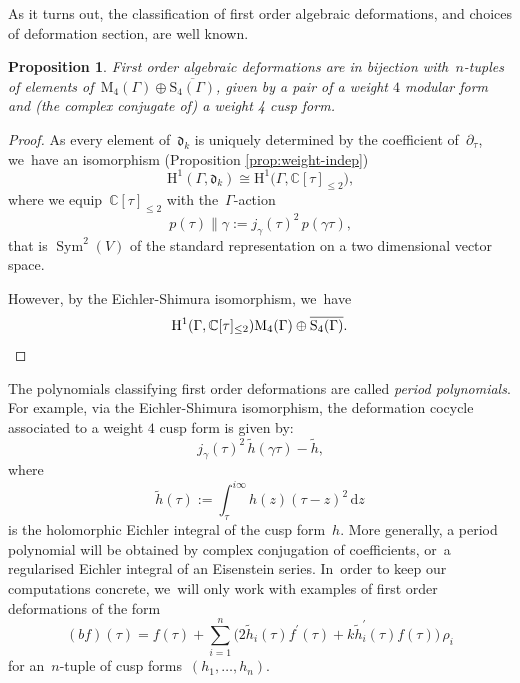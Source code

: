 \documentclass[10pt,a4paper]{article}
\numberwithin{equation}{section}
\theoremstyle{plain}
\newtheorem{proposition}[theoremcounter]{Proposition}
\theoremstyle{definition}
\newcommand{\tx}{\text}
\newcommand{\nbd}{\nobreakdash-\hspace{0pt}}
\newcommand{\bbC}{\ensuremath{\mathbb{C}}}
\newcommand{\frakd}{\ensuremath{\mathfrak{d}}}
\newcommand{\rmd}{\ensuremath{\mathrm{d}}}
\newcommand{\rmH}{\ensuremath{\mathrm{H}}}
\newcommand{\rmM}{\ensuremath{\mathrm{M}}}
\newcommand{\rmS}{\ensuremath{\mathrm{S}}}
\newcommand{\defeq}{:=}
\let\Ga\Gamma
\let\ga\gamma
\DeclareMathOperator{\Sym}{Sym}
\newcommand{\dz}{\rmd z}
\begin{document}
As it turns out, the classification of first order algebraic deformations, and choices of deformation section, are well known.

\begin{proposition}
\label{prop:first-order-cusp-forms}
First order algebraic deformations are in bijection with~$n$-tuples of elements of~$\rmM_4(\Ga)\oplus \overline{\rmS_4(\Ga)}$, given by a pair of a weight $4$ modular form and (the complex conjugate of) a weight 4 cusp form.
\end{proposition}
\begin{proof}
As every element of~$\frakd_k$ is uniquely determined by the coefficient of~$\partial_\tau$, we~have an isomorphism (Proposition \ref{prop:weight-indep})
\begin{equation*}
\rmH^1(\Ga,\frakd_k)
\cong
\rmH^1\bigl(\Ga, \bbC[\tau]_{\leq 2} \bigr)
\tx{,}
\end{equation*}
where we equip~$\bbC[\tau]_{\leq 2}$ with the~$\Ga$\nbd{}action
\begin{equation*}
p(\tau) \big\| \ga
\defeq
j_\ga(\tau)^2\, p(\ga\tau)
\tx{,}
\end{equation*}
that is $\Sym^2(V)$ of the standard representation on a two dimensional vector space.

However, by the Eichler-Shimura isomorphism, we~have
\[
\rmH^1(\Ga,\bbC[\tau]_{\leq 2})\rmM_4(\Ga)\oplus \overline{\rmS_4(\Ga)}.\qedhere
\]
\end{proof}

The polynomials classifying first order deformations are called \emph{period polynomials}. For example, via the Eichler-Shimura isomorphism, the deformation cocycle associated to a weight $4$ cusp form is given by:
\begin{equation*}
j_\ga(\tau)^2\,
\tilde{h}(\ga\tau) - \tilde{h}
\tx{,}
\end{equation*}
where
\begin{equation}\label{eq:eicher-integral-def}
\tilde{h}(\tau)
\defeq
\int_{\tau}^{i\infty} h(z)(\tau-z)^2 \,\dz
\end{equation}
is the holomorphic Eichler integral of the cusp form~$h$. More generally, a period polynomial will be obtained by complex conjugation of coefficients, or~a regularised Eichler integral of an Eisenstein series. In~order to keep our computations concrete, we~will only work with examples of first order deformations of the form
\begin{equation*}
(b f)(\tau)
=
f(\tau)
+
\sum_{i=1}^n
\bigl(2\tilde{h}_i(\tau) f^\prime(\tau) + k \tilde{h}^\prime_i(\tau) f(\tau) \bigr)\, \rho_i
\end{equation*}
for an~$n$-tuple of cusp forms~$(h_1,\ldots,h_n)$.
\end{document}
